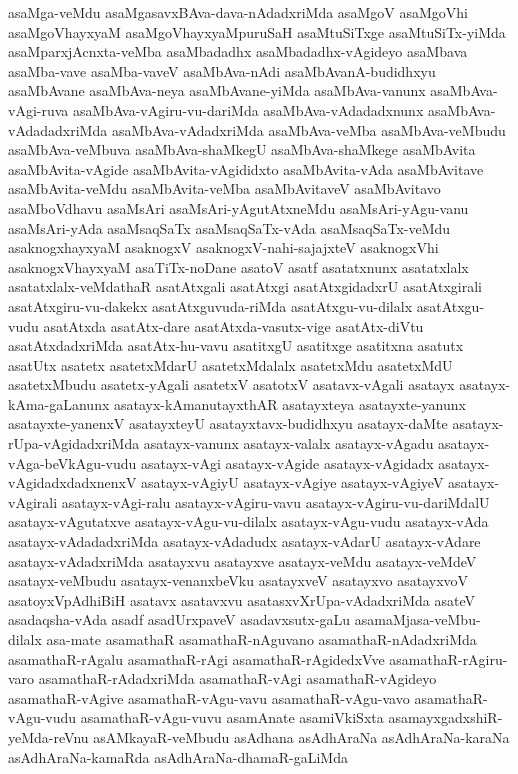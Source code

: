 {asaMga-veMdu
asaMgasavxBAva-dava-nAdadxriMda
asaMgoV
asaMgoVhi
asaMgoVhayxyaM
asaMgoVhayxyaMpuruSaH
asaMtuSiTxge
asaMtuSiTx-yiMda
asaMparxjAcnxta-veMba
asaMbadadhx
asaMbadadhx-vAgideyo
asaMbava
asaMba-vave
asaMba-vaveV
asaMbAva-nAdi
asaMbAvanA-budidhxyu
asaMbAvane
asaMbAva-neya
asaMbAvane-yiMda
asaMbAva-vanunx
asaMbAva-vAgi-ruva
asaMbAva-vAgiru-vu-dariMda
asaMbAva-vAdadadxnunx
asaMbAva-vAdadadxriMda
asaMbAva-vAdadxriMda
asaMbAva-veMba
asaMbAva-veMbudu
asaMbAva-veMbuva
asaMbAva-shaMkegU
asaMbAva-shaMkege
asaMbAvita
asaMbAvita-vAgide
asaMbAvita-vAgididxto
asaMbAvita-vAda
asaMbAvitave
asaMbAvita-veMdu
asaMbAvita-veMba
asaMbAvitaveV
asaMbAvitavo
asaMboVdhavu
asaMsAri
asaMsAri-yAgutAtxneMdu
asaMsAri-yAgu-vanu
asaMsAri-yAda
asaMsaqSaTx
asaMsaqSaTx-vAda
asaMsaqSaTx-veMdu
asaknogxhayxyaM
asaknogxV
asaknogxV-nahi-sajajxteV
asaknogxVhi
asaknogxVhayxyaM
asaTiTx-noDane
asatoV
asatf
asatatxnunx
asatatxlalx
asatatxlalx-veMdathaR
asatAtxgali
asatAtxgi
asatAtxgidadxrU
asatAtxgirali
asatAtxgiru-vu-dakekx
asatAtxguvuda-riMda
asatAtxgu-vu-dilalx
asatAtxgu-vudu
asatAtxda
asatAtx-dare
asatAtxda-vasutx-vige
asatAtx-diVtu
asatAtxdadxriMda
asatAtx-hu-vavu
asatitxgU
asatitxge
asatitxna
asatutx
asatUtx
asatetx
asatetxMdarU
asatetxMdalalx
asatetxMdu
asatetxMdU
asatetxMbudu
asatetx-yAgali
asatetxV
asatotxV
asatavx-vAgali
asatayx
asatayx-kAma-gaLanunx
asatayx-kAmanutayxthAR
asatayxteya
asatayxte-yanunx
asatayxte-yanenxV
asatayxteyU
asatayxtavx-budidhxyu
asatayx-daMte
asatayx-rUpa-vAgidadxriMda
asatayx-vanunx
asatayx-valalx
asatayx-vAgadu
asatayx-vAga-beVkAgu-vudu
asatayx-vAgi
asatayx-vAgide
asatayx-vAgidadx
asatayx-vAgidadxdadxnenxV
asatayx-vAgiyU
asatayx-vAgiye
asatayx-vAgiyeV
asatayx-vAgirali
asatayx-vAgi-ralu
asatayx-vAgiru-vavu
asatayx-vAgiru-vu-dariMdalU
asatayx-vAgutatxve
asatayx-vAgu-vu-dilalx
asatayx-vAgu-vudu
asatayx-vAda
asatayx-vAdadadxriMda
asatayx-vAdadudx
asatayx-vAdarU
asatayx-vAdare
asatayx-vAdadxriMda
asatayxvu
asatayxve
asatayx-veMdu
asatayx-veMdeV
asatayx-veMbudu
asatayx-venanxbeVku
asatayxveV
asatayxvo
asatayxvoV
asatoyxVpAdhiBiH
asatavx
asatavxvu
asatasxvXrUpa-vAdadxriMda
asateV
asadaqsha-vAda
asadf
asadUrxpaveV
asadavxsutx-gaLu
asamaMjasa-veMbu-dilalx
asa-mate
asamathaR
asamathaR-nAguvano
asamathaR-nAdadxriMda
asamathaR-rAgalu
asamathaR-rAgi
asamathaR-rAgidedxVve
asamathaR-rAgiru-varo
asamathaR-rAdadxriMda
asamathaR-vAgi
asamathaR-vAgideyo
asamathaR-vAgive
asamathaR-vAgu-vavu
asamathaR-vAgu-vavo
asamathaR-vAgu-vudu
asamathaR-vAgu-vuvu
asamAnate
asamiVkiSxta
asamayxgadxshiR-yeMda-reVnu
asAMkayaR-veMbudu
asAdhana
asAdhAraNa
asAdhAraNa-karaNa
asAdhAraNa-kamaRda
asAdhAraNa-dhamaR-gaLiMda
}
